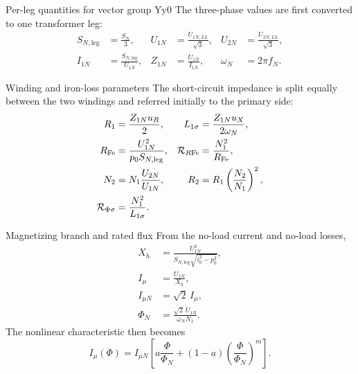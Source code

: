 	\begin{formulaBox}{Per-leg quantities for vector group $\mathrm{Yy0}$}
		The three-phase values are first converted to one transformer leg:
		\begin{align}
			S_{N,\mathrm{leg}} &= \frac{S_N}{3}, &
			U_{1N} &= \frac{U_{1N,LL}}{\sqrt{3}}, &
			U_{2N} &= \frac{U_{2N,LL}}{\sqrt{3}},\\
			I_{1N} &= \frac{S_{N,\mathrm{leg}}}{U_{1N}}, &
			Z_{1N} &= \frac{U_{1N}}{I_{1N}}, &
			\omega_N &= 2\pi f_N.
		\end{align}
	\end{formulaBox}
	
	\begin{formulaBox}{Winding and iron-loss parameters}
		The short-circuit impedance is split equally between the two windings and
		referred initially to the primary side:
		\begin{align}
			R_1 &= \frac{Z_{1N}u_R}{2}, &
			L_{1\sigma} &= \frac{Z_{1N}u_X}{2\omega_N},\\
			R_{\mathrm{Fe}} &= \frac{U_{1N}^2}{p_0S_{N,\mathrm{leg}}}, &
			\mathcal{R}_{R\mathrm{Fe}} &= \frac{N_1^2}{R_{\mathrm{Fe}}},\\
			N_2 &= N_1\frac{U_{2N}}{U_{1N}}, &
			R_2 &= R_1\left(\frac{N_2}{N_1}\right)^2,\\
			\mathcal{R}_{\Phi\sigma} &= \frac{N_1^2}{L_{1\sigma}}. &&
		\end{align}
	\end{formulaBox}
	
	\newpage
	\thispagestyle{scrheadings}
	
	\begin{formulaBox}{Magnetizing branch and rated flux}
		From the no-load current and no-load losses,
		\begin{align}
			X_h &= \frac{U_{1N}^2}
			{S_{N,\mathrm{leg}}\sqrt{i_0^2-p_0^2}},\\
			I_\mu &= \frac{U_{1N}}{X_h},\\
			I_{\mu N} &= \sqrt{2}\,I_\mu,\\
			\Phi_N &= \frac{\sqrt{2}\,U_{1N}}{\omega_NN_1}.
		\end{align}
		The nonlinear characteristic then becomes
		\begin{equation}
			I_\mu(\Phi)=I_{\mu N}
			\left[
			a\frac{\Phi}{\Phi_N}
			+(1-a)\left(\frac{\Phi}{\Phi_N}\right)^m
			\right].
		\end{equation}
	\end{formulaBox}
	
